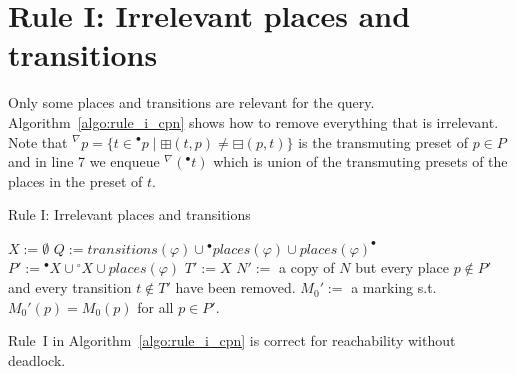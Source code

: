 \section*{Rule I: Irrelevant places and transitions}\label{sec:rule_i_cpn}
Only some places and transitions are relevant for the query.
Algorithm~\ref{algo:rule_i_cpn} shows how to remove everything that is irrelevant.
Note that ${}^\nabla p=\{t\in {}^\bullet p\mid\boxplus(t,p)\neq\boxminus(p,t)\}$ is the transmuting preset of $p\in P$ and
in line 7 we enqueue ${}^\nabla({}^\bullet t)$ which is union of the transmuting presets of the places in the preset of $t$.

\begin{algorithm}
    \vspace{0.2cm}
    \caption{Rule I: Irrelevant places and transitions}
    \label{algo:rule_i_cpn}
    \DontPrintSemicolon
    \LinesNumbered
    \vspace{1mm}
    $X:=\emptyset$
    $Q:=transitions(\varphi)\cup{}^\bullet places(\varphi)\cup places(\varphi)^\bullet$
    $P':={}^\bullet X\cup {}^\circ X\cup places(\varphi)$\;
    $T':=X$\;
    $N':=$ a copy of $N$ but every place $p\notin P'$ and every transition $t\notin T'$ have been removed.\;
    $M_0':=$ a marking s.t.\ $M_0'(p)=M_0(p)$ for all $p\in P'$.\;
    \vspace{0.2cm}
\end{algorithm}

\begin{theorem}
    Rule~I in Algorithm~\ref{algo:rule_i_cpn} is correct for reachability without deadlock.
\end{theorem}